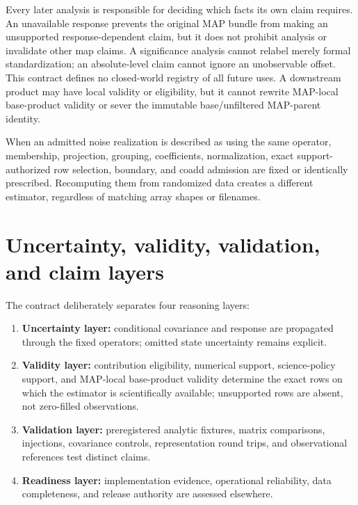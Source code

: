 \documentclass[10pt]{article}
\begin{document}
Every later analysis is responsible for deciding which facts its own claim
requires. An unavailable response prevents the original MAP bundle from making
an unsupported response-dependent claim, but it does not prohibit analysis or
invalidate other map claims. A significance analysis cannot relabel merely
formal standardization; an absolute-level claim cannot ignore an unobservable
offset. This contract defines no closed-world registry of all future uses. A
downstream product may have local validity or eligibility, but it cannot
rewrite MAP-local base-product validity or sever the immutable base/unfiltered
MAP-parent identity.

When an admitted noise realization is described as using the same operator,
membership, projection, grouping, coefficients, normalization, exact
support-authorized row selection, boundary, and coadd admission are fixed or
identically prescribed. Recomputing them from randomized data creates a
different estimator, regardless of matching array shapes or filenames.

\clearpage
\section{Uncertainty, validity, validation, and claim layers}

The contract deliberately separates four reasoning layers:

\begin{enumerate}
\item \textbf{Uncertainty layer:} conditional covariance and response are
propagated through the fixed operators; omitted state uncertainty remains
explicit.
\item \textbf{Validity layer:} contribution eligibility, numerical support,
science-policy support, and MAP-local base-product validity determine the exact rows on
which the estimator is scientifically available; unsupported rows are absent,
not zero-filled observations.
\item \textbf{Validation layer:} preregistered analytic fixtures, matrix
comparisons, injections, covariance controls, representation round trips, and
observational references test distinct claims.
\item \textbf{Readiness layer:} implementation evidence, operational
reliability, data completeness, and release authority are assessed elsewhere.
\end{enumerate}
\end{document}
